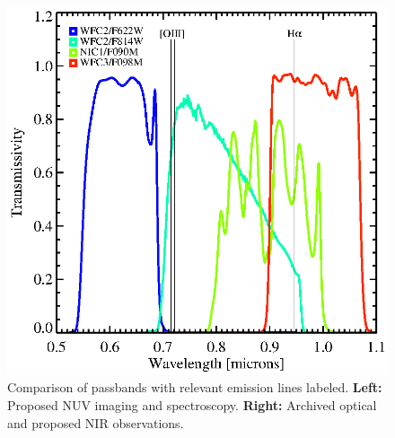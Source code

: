 \documentclass[12pt]{article}
\begin{document}
\begin{figure}[htp]
\begin{center}
\begin{minipage}{0.53\linewidth}
    \end{minipage}
    \begin{minipage}{0.46\linewidth}	
      \includegraphics*[width=\textwidth, trim=32mm 5mm 40mm 5mm, clip]{nic1}
    \end{minipage}
    \caption{Comparison of passbands with relevant emission lines
      labeled. {\bf{Left:}} Proposed NUV imaging and
      spectroscopy. {\bf{Right:}} Archived optical and proposed NIR
      observations.}
    \label{fig:hst}
 \end{center}
\end{figure}

\end{document}
